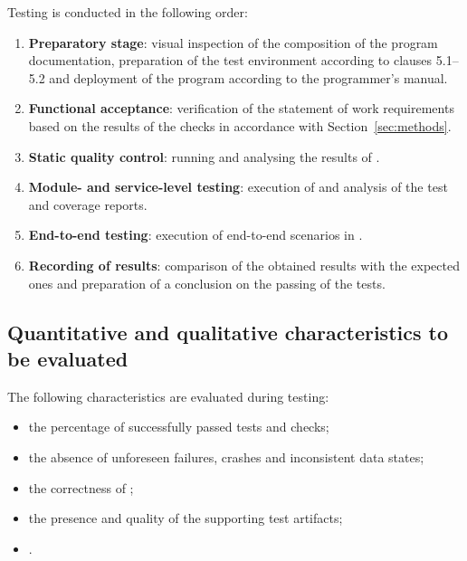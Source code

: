 \documentclass[12pt,a4paper]{extarticle}
\begin{document}
\begin{hseExample}
Testing is conducted in the following order:

\begin{enumerate}[label=\arabic*), leftmargin=1.25cm]
    \item \textbf{Preparatory stage}: visual inspection of the composition of the program documentation, preparation of the test environment according to clauses 5.1--5.2 and deployment of the program according to the programmer's manual.
    \item \textbf{Functional acceptance}: verification of the statement of work requirements based on the results of the checks in accordance with Section~\ref{sec:methods}.
    \item \textbf{Static quality control}: running and analysing the results of .
    \item \textbf{Module- and service-level testing}: execution of  and analysis of the test and coverage reports.
    \item \textbf{End-to-end testing}: execution of end-to-end scenarios in .
    \item \textbf{Recording of results}: comparison of the obtained results with the expected ones and preparation of a conclusion on the passing of the tests.
\end{enumerate}
\end{hseExample}

\subsection{Quantitative and qualitative characteristics to be evaluated}

\begin{hseExample}
The following characteristics are evaluated during testing:

\begin{itemize}[leftmargin=1.25cm]
    \item the percentage of successfully passed tests and checks;
    \item the absence of unforeseen failures, crashes and inconsistent data states;
    \item the correctness of ;
    \item the presence and quality of the supporting test artifacts;
    \item {}.
\end{itemize}
\end{hseExample}
\end{document}
